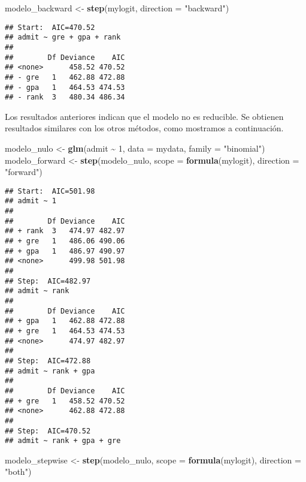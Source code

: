 \documentclass[
]{article}
\newenvironment{Shaded}{\begin{snugshade}}{\end{snugshade}}
\newcommand{\AttributeTok}[1]{\textcolor[rgb]{0.13,0.29,0.53}{#1}}
\newcommand{\DecValTok}[1]{\textcolor[rgb]{0.00,0.00,0.81}{#1}}
\newcommand{\FunctionTok}[1]{\textcolor[rgb]{0.13,0.29,0.53}{\textbf{#1}}}
\newcommand{\NormalTok}[1]{#1}
\newcommand{\OtherTok}[1]{\textcolor[rgb]{0.56,0.35,0.01}{#1}}
\newcommand{\SpecialCharTok}[1]{\textcolor[rgb]{0.81,0.36,0.00}{\textbf{#1}}}
\newcommand{\StringTok}[1]{\textcolor[rgb]{0.31,0.60,0.02}{#1}}
\begin{document}
\begin{Shaded}
\begin{Highlighting}[]
\NormalTok{modelo\_backward }\OtherTok{\textless{}{-}} \FunctionTok{step}\NormalTok{(mylogit, }\AttributeTok{direction =} \StringTok{"backward"}\NormalTok{)}
\end{Highlighting}
\end{Shaded}

\begin{verbatim}
## Start:  AIC=470.52
## admit ~ gre + gpa + rank
## 
##        Df Deviance    AIC
## <none>      458.52 470.52
## - gre   1   462.88 472.88
## - gpa   1   464.53 474.53
## - rank  3   480.34 486.34
\end{verbatim}

Los resultados anteriores indican que el modelo no es reducible. Se
obtienen resultados similares con los otros métodos, como mostramos a
continuación.

\begin{Shaded}
\begin{Highlighting}[]
\NormalTok{modelo\_nulo }\OtherTok{\textless{}{-}} \FunctionTok{glm}\NormalTok{(admit }\SpecialCharTok{\textasciitilde{}} \DecValTok{1}\NormalTok{, }\AttributeTok{data =}\NormalTok{ mydata, }\AttributeTok{family =} \StringTok{"binomial"}\NormalTok{)}
\NormalTok{modelo\_forward }\OtherTok{\textless{}{-}} \FunctionTok{step}\NormalTok{(modelo\_nulo, }\AttributeTok{scope =} \FunctionTok{formula}\NormalTok{(mylogit), }\AttributeTok{direction =} \StringTok{"forward"}\NormalTok{)}
\end{Highlighting}
\end{Shaded}

\begin{verbatim}
## Start:  AIC=501.98
## admit ~ 1
## 
##        Df Deviance    AIC
## + rank  3   474.97 482.97
## + gre   1   486.06 490.06
## + gpa   1   486.97 490.97
## <none>      499.98 501.98
## 
## Step:  AIC=482.97
## admit ~ rank
## 
##        Df Deviance    AIC
## + gpa   1   462.88 472.88
## + gre   1   464.53 474.53
## <none>      474.97 482.97
## 
## Step:  AIC=472.88
## admit ~ rank + gpa
## 
##        Df Deviance    AIC
## + gre   1   458.52 470.52
## <none>      462.88 472.88
## 
## Step:  AIC=470.52
## admit ~ rank + gpa + gre
\end{verbatim}

\begin{Shaded}
\begin{Highlighting}[]
\NormalTok{modelo\_stepwise }\OtherTok{\textless{}{-}} \FunctionTok{step}\NormalTok{(modelo\_nulo, }\AttributeTok{scope =} \FunctionTok{formula}\NormalTok{(mylogit), }\AttributeTok{direction =} \StringTok{"both"}\NormalTok{)}
\end{Highlighting}
\end{Shaded}
\end{document}
